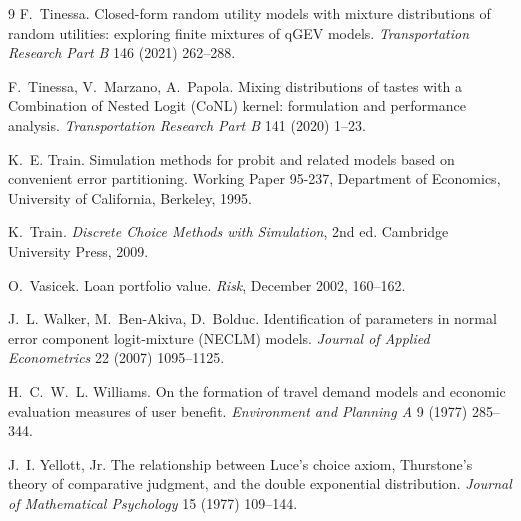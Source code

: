 \documentclass[12pt]{article}
\theoremstyle{remark}
\begin{document}
\begin{thebibliography}{9}
 F.~Tinessa. Closed-form random
utility models with mixture distributions of random utilities:
exploring finite mixtures of qGEV models. \emph{Transportation
Research Part B} 146 (2021) 262--288.

F.~Tinessa, V.~Marzano, A.~Papola. Mixing distributions of tastes with
a Combination of Nested Logit (CoNL) kernel: formulation and
performance analysis. \emph{Transportation Research Part B} 141 (2020)
1--23.

 K.~E. Train. Simulation methods for
probit and related models based on convenient error partitioning.
Working Paper 95-237, Department of Economics, University of
California, Berkeley, 1995.

 K.~Train. \emph{Discrete Choice Methods with Simulation},
2nd ed. Cambridge University Press, 2009.

 O.~Vasicek. Loan portfolio value.
\emph{Risk}, December 2002, 160--162.

J.~L. Walker, M.~Ben-Akiva, D.~Bolduc. Identification of parameters in
normal error component logit-mixture (NECLM) models. \emph{Journal of
Applied Econometrics} 22 (2007) 1095--1125.

 H.~C.~W.~L. Williams. On the
formation of travel demand models and economic evaluation measures of
user benefit. \emph{Environment and Planning A} 9 (1977) 285--344.

 J.~I. Yellott, Jr. The
relationship between Luce's choice axiom, Thurstone's theory of
comparative judgment, and the double exponential distribution.
\emph{Journal of Mathematical Psychology} 15 (1977) 109--144.

\end{thebibliography}
\end{document}
